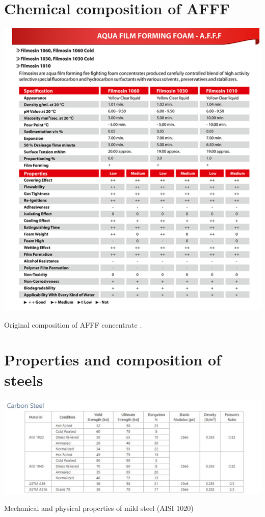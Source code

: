 \documentclass[12pt]{report}
\begin{document}



\appendix

\chapter{Chemical composition of AFFF}
\begin{table}[H]
    \centering
    \includegraphics[width=\textwidth]{original_composition_of_afff_concentrate.png}
    \caption{Original composition of AFFF concentrate \cite{hinnant2020characterizing}.}
\end{table}

\chapter{Properties and composition of steels}
\begin{table}[H]
    \centering
    \includegraphics[width=\textwidth]{mechanical_and_physical_properties_of_mild_steel.jpg}
    \caption{Mechanical and physical properties of mild steel (AISI 1020) \cite{kabir2020critical}}
\end{table}
\end{document}
